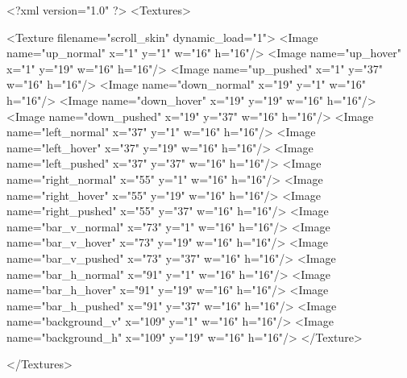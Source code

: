 <?xml version="1.0" ?>
<Textures>

	<Texture filename="scroll_skin" dynamic_load="1">
		<Image name="up_normal" x="1" y="1" w="16" h="16"/>
		<Image name="up_hover" x="1" y="19" w="16" h="16"/>
		<Image name="up_pushed" x="1" y="37" w="16" h="16"/>
		<Image name="down_normal" x="19" y="1" w="16" h="16"/>
		<Image name="down_hover" x="19" y="19" w="16" h="16"/>
		<Image name="down_pushed" x="19" y="37" w="16" h="16"/>
		<Image name="left_normal" x="37" y="1" w="16" h="16"/>
		<Image name="left_hover" x="37" y="19" w="16" h="16"/>
		<Image name="left_pushed" x="37" y="37" w="16" h="16"/>
		<Image name="right_normal" x="55" y="1" w="16" h="16"/>
		<Image name="right_hover" x="55" y="19" w="16" h="16"/>
		<Image name="right_pushed" x="55" y="37" w="16" h="16"/>
		<Image name="bar_v_normal" x="73" y="1" w="16" h="16"/>
		<Image name="bar_v_hover" x="73" y="19" w="16" h="16"/>
		<Image name="bar_v_pushed" x="73" y="37" w="16" h="16"/>
		<Image name="bar_h_normal" x="91" y="1" w="16" h="16"/>
		<Image name="bar_h_hover" x="91" y="19" w="16" h="16"/>
		<Image name="bar_h_pushed" x="91" y="37" w="16" h="16"/>
		<Image name="background_v" x="109" y="1" w="16" h="16"/>
		<Image name="background_h" x="109" y="19" w="16" h="16"/>
    </Texture>
	
</Textures>
